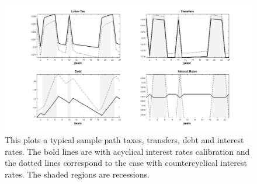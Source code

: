 \documentclass[thmsb,11pt]{article}
\begin{document}
\begin{figure}[htp]
\centering
\includegraphics[width=\textwidth]{Draft25Graphs/DiscoutFactorComparison2.png}
\caption{This plots a typical sample path taxes, transfers, debt and interest rates.  The bold lines  are with acyclical interest rates calibration and the dotted lines correspond to the case with countercyclical interest rates. The shaded regions are recessions.}
\label{fig:DiscoutFactorComparison2}
\end{figure}
\end{document}
